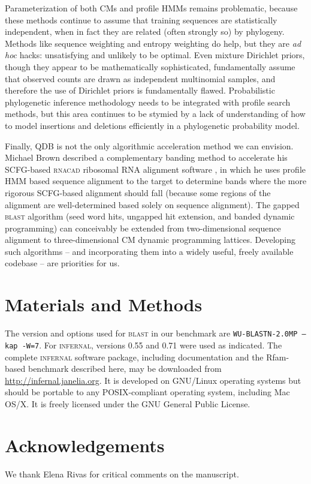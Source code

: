 \documentclass[11pt]{article}
\begin{document}
Parameterization of both CMs and profile HMMs remains problematic,
because these methods continue to assume that training sequences are
statistically independent, when in fact they are related (often
strongly so) by phylogeny. Methods like sequence weighting and entropy
weighting do help, but they are \emph{ad hoc} hacks: unsatisfying and
unlikely to be optimal. Even mixture Dirichlet priors, though they
appear to be mathematically sophisticated, fundamentally assume that
observed counts are drawn as independent multinomial samples, and
therefore the use of Dirichlet priors is fundamentally flawed.
Probabilistic phylogenetic inference methodology needs to be
integrated with profile search methods, but this area continues to be
stymied by a lack of understanding of how to model insertions and
deletions efficiently in a phylogenetic probability model.

Finally, QDB is not the only algorithmic acceleration method we can
envision.  Michael Brown described a complementary banding method to
accelerate his SCFG-based \textsc{rnacad} ribosomal RNA alignment
software \cite{Brown00}, in which he uses profile HMM based sequence
alignment to the target to determine bands where the more rigorous
SCFG-based alignment should fall (because some regions of the
alignment are well-determined based solely on sequence alignment). The
gapped \textsc{blast} algorithm (seed word hits, ungapped hit extension, and
banded dynamic programming) can conceivably be extended from
two-dimensional sequence alignment to three-dimensional CM dynamic
programming lattices. Developing such algorithms -- and incorporating
them into a widely useful, freely available codebase -- are priorities
for us.

\section{Materials and Methods}

The version and options used for \textsc{blast} in our benchmark are
\texttt{WU-BLASTN-2.0MP --kap -W=7}.  For \textsc{infernal}, versions 0.55
and 0.71 were used as indicated. The complete \textsc{infernal}
software package, including documentation and the Rfam-based benchmark
described here, may be downloaded from
\url{http://infernal.janelia.org}. It is developed on GNU/Linux
operating systems but should be portable to any POSIX-compliant
operating system, including Mac OS/X. It is freely licensed under the
GNU General Public License.


\section{Acknowledgements}
We thank Elena Rivas for critical comments on the manuscript.
\end{document}
